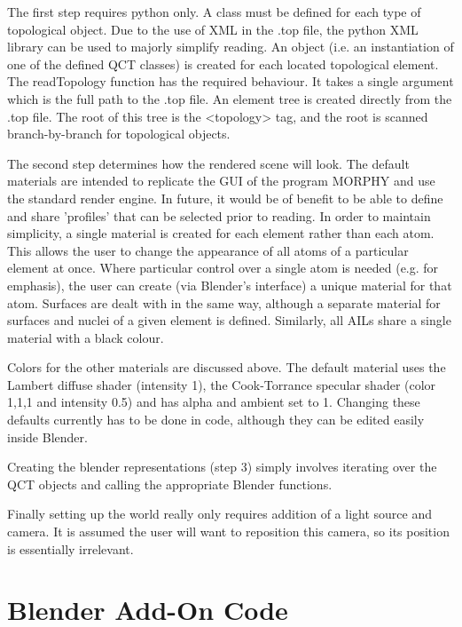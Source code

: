 \documentclass{report}
\begin{document}
The first step requires python only. A class must be defined for each type of topological object.
Due to the use of XML in the .top file, the python XML library can be used to majorly simplify reading.
An object (i.e. an instantiation of one of the defined QCT classes) is created for each located topological element.
The readTopology function has the required behaviour. It takes a single argument which is the full path to the .top file.
An element tree is created directly from the .top file. The root of this tree is the <topology> tag, and the root is scanned branch-by-branch for topological objects.


The second step determines how the rendered scene will look.
The default materials are intended to replicate the GUI of the program MORPHY and use the standard render engine.
In future, it would be of benefit to be able to define and share 'profiles' that can be selected prior to reading.
In order to maintain simplicity, a single material is created for each element rather than each atom.
This allows the user to change the appearance of all atoms of a particular element at once.
Where particular control over a single atom is needed (e.g. for emphasis), the user can create (via Blender's interface) a unique material for that atom.
Surfaces are dealt with in the same way, although a separate material for surfaces and nuclei of a given element is defined.
Similarly, all AILs share a single material with a black colour.

Colors for the other materials are discussed above. The default material uses the Lambert diffuse shader (intensity 1), 
the Cook-Torrance specular shader (color 1,1,1 and intensity 0.5) and has alpha and ambient set to 1.
Changing these defaults currently has to be done in code, although they can be edited easily inside Blender.

Creating the blender representations (step 3) simply involves iterating over the QCT objects and calling the appropriate Blender functions.

Finally setting up the world really only requires addition of a light source and camera.
It is assumed the user will want to reposition this camera, so its position is essentially irrelevant.

\section{Blender Add-On Code}
\end{document}
